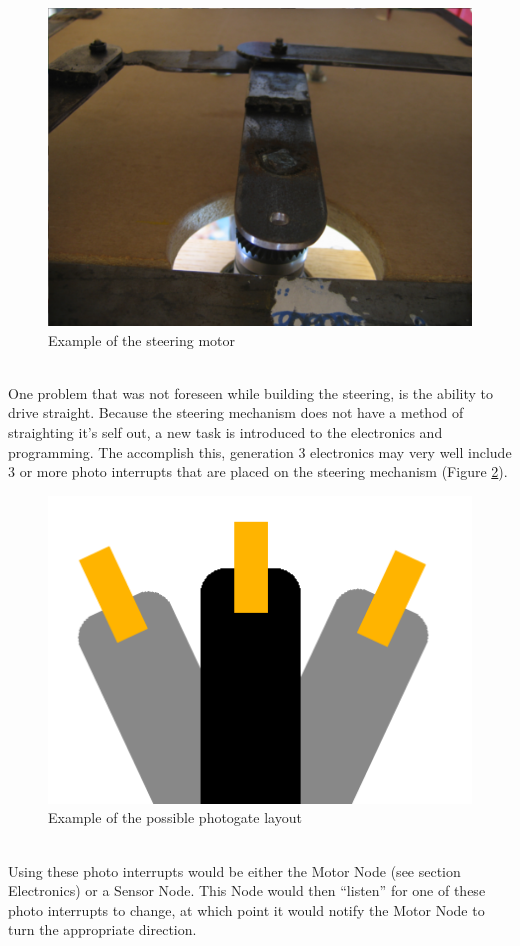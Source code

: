 \documentclass{article}
\begin{document}
\begin{figure}[htp]
  \begin{center}
\includegraphics[scale=0.25]{steeringmotor}
  \end{center}
  \caption{Example of the steering motor}
\label{steeringmotor}
\end{figure}\\
One problem that was not foreseen while building the steering, is the ability to drive straight. Because the steering mechanism does not have a method of straighting it's self out, a new task is introduced to the electronics and programming. The accomplish this, generation 3 electronics may very well include 3 or more photo interrupts that are placed on the steering mechanism (Figure \ref{photogate}).
\begin{figure}[htp]
  \begin{center}
\includegraphics[scale=0.25]{photogate}
  \end{center}
  \caption{Example of the possible photogate layout}
\label{photogate}
\end{figure}\\
Using these photo interrupts would be either the Motor Node (see section Electronics) or a Sensor Node. This Node would then “listen” for one of these photo interrupts to change, at which point it would notify the Motor Node to turn the appropriate direction.\\
\end{document}
